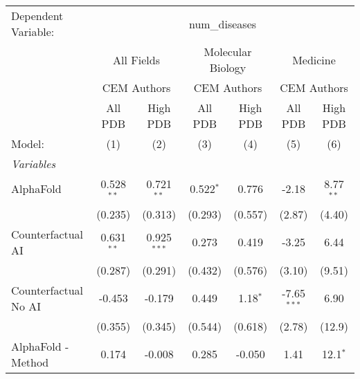 \begingroup
\centering
\begin{tabular}{lcccccc}
   \tabularnewline \midrule \midrule
   Dependent Variable: & \multicolumn{6}{c}{num\_diseases}\\
 & \multicolumn{2}{c}{All Fields} & \multicolumn{2}{c}{Molecular Biology} & \multicolumn{2}{c}{Medicine} \\
\cmidrule(lr){2-3} \cmidrule(lr){4-5} \cmidrule(lr){6-7}
 & \multicolumn{2}{c}{CEM Authors} & \multicolumn{2}{c}{CEM Authors} & \multicolumn{2}{c}{CEM Authors} \\
\cmidrule(lr){2-3} \cmidrule(lr){4-5} \cmidrule(lr){6-7}
 & \multicolumn{1}{c}{All PDB} & \multicolumn{1}{c}{High PDB} & \multicolumn{1}{c}{All PDB} & \multicolumn{1}{c}{High PDB} & \multicolumn{1}{c}{All PDB} & \multicolumn{1}{c}{High PDB} \\
\cmidrule(lr){2-2} \cmidrule(lr){3-3} \cmidrule(lr){4-4} \cmidrule(lr){5-5} \cmidrule(lr){6-6} \cmidrule(lr){7-7}
   Model:                                                     & (1)           & (2)           & (3)          & (4)           & (5)           & (6)\\  
   \midrule
   \emph{Variables}\\
   AlphaFold                                                  & 0.528$^{**}$  & 0.721$^{**}$  & 0.522$^{*}$  & 0.776         & -2.18         & 8.77$^{**}$\\   
                                                              & (0.235)       & (0.313)       & (0.293)      & (0.557)       & (2.87)        & (4.40)\\   
   Counterfactual AI                                          & 0.631$^{**}$  & 0.925$^{***}$ & 0.273        & 0.419         & -3.25         & 6.44\\   
                                                              & (0.287)       & (0.291)       & (0.432)      & (0.576)       & (3.10)        & (9.51)\\   
   Counterfactual No AI                                       & -0.453        & -0.179        & 0.449        & 1.18$^{*}$    & -7.65$^{***}$ & 6.90\\   
                                                              & (0.355)       & (0.345)       & (0.544)      & (0.618)       & (2.78)        & (12.9)\\   
   AlphaFold - Method                                         & 0.174         & -0.008        & 0.285        & -0.050        & 1.41          & 12.1$^{*}$\\   

\end{tabular}

